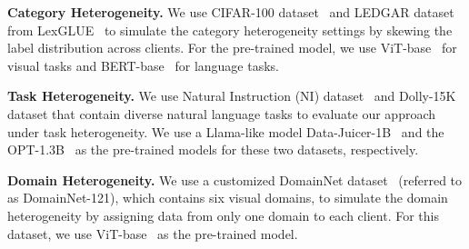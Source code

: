\documentclass[sigconf]{acmart}
\begin{document}
\textbf{Category Heterogeneity.} We use CIFAR-100 dataset~\cite{krizhevsky2009learning} and LEDGAR dataset from LexGLUE~\cite{chalkidis-etal-2021-lexglue} to simulate the category heterogeneity settings by skewing the label distribution across clients. For the pre-trained model, we use ViT-base~\cite{dosovitskiy2020image} for visual tasks and BERT-base~\cite{devlin2019bert} for language tasks. 

\textbf{Task Heterogeneity.} We use Natural Instruction (NI) dataset~\cite{wang2022super} and Dolly-15K~\cite{conover2023free} dataset that contain diverse natural language tasks to evaluate our approach under task heterogeneity. 
We use a Llama-like model Data-Juicer-1B~\cite{chen2024data} and the OPT-1.3B~\cite{zhang2022opt} as the pre-trained models for these two datasets, respectively. 


\textbf{Domain Heterogeneity.} 
We use a customized DomainNet dataset~\cite{peng2019moment} (referred to as DomainNet-121), which contains six visual domains, to simulate the domain heterogeneity by assigning data from only one domain to each client. For this dataset, we use ViT-base~\cite{dosovitskiy2020image} as the pre-trained model. 
\end{document}
